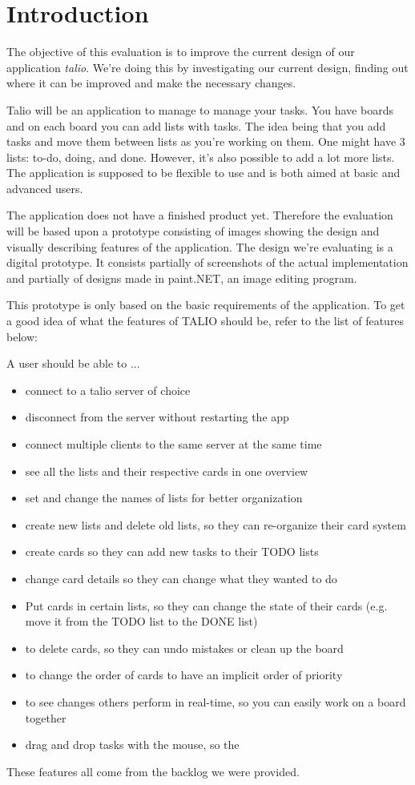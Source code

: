 \section{Introduction}

The objective of this evaluation is to improve the current design of our application \textit{talio}. We're doing this by investigating our current design, finding out where it can be improved and make the necessary changes. 

Talio will be an application to manage to manage your tasks. You have boards and on each board you can add lists with tasks. The idea being that you add tasks and move them between lists as you're working on them. One might have 3 lists: to-do, doing, and done. However, it's also possible to add a lot more lists. The application is supposed to be flexible to use and is both aimed at basic and advanced users.

The application does not have a finished product yet. Therefore the evaluation will be based upon a prototype consisting of images showing the design and visually describing features of the application.
The design we're evaluating is a digital prototype. It consists partially of screenshots of the actual implementation and partially of designs made in paint.NET\cite{paintNET}, an image editing program.

This prototype is only based on the basic requirements of the application. To get a good idea of what the features of TALIO should be, refer to the list of features below:

A user should be able to ...
\begin{itemize}
    \item connect to a talio server of choice
    \item disconnect from the server without restarting the app
    \item connect multiple clients to the same server at the same time
    \item see all the lists and their respective cards in one overview
        \item set and change the names of lists for better organization
    \item create new lists and delete old lists, so they can re-organize their card system
    \item create cards so they can add new tasks to their TODO lists
    \item change card details so they can change what they wanted to do
    \item Put cards in certain lists, so they can change the state of their cards (e.g. move it from the TODO list to the DONE list)
    \item to delete cards, so they can undo mistakes or clean up the board
    \item to change the order of cards to have an implicit order of priority
    \item to see changes others perform in real-time, so you can easily work on a board together
    \item drag and drop tasks with the mouse, so the
\end{itemize}
These features all come from the backlog we were provided.\cite{backlog}
